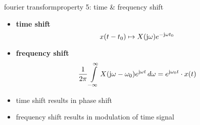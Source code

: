         \begin{frame}{fourier transform}{property 5: time \& frequency shift}
            \begin{itemize}
                \item \textbf{time shift}
                \begin{equation*}\label{eq:fft_timeshift}
                    x(t-t_0) \mapsto X(\mathrm{j}\omega){e}^{-\mathrm{j}\omega t_0} 
                \end{equation*} 
                \item \textbf{frequency shift}
                \begin{equation*}
                            \frac{1}{2\pi}\int\limits_{-\infty}^{\infty} X(\mathrm{j}\omega-\omega_0) {e}^{\mathrm{j}\omega t}\, d\omega = {e}^{\mathrm{j}\omega_0 t}\cdot x(t) 		
                \end{equation*} 
            
            \end{itemize}
            
            \bigskip
            \begin{itemize}
                \item<2->   time shift results in phase shift
                \item<2->   frequency shift results in modulation of time signal
            \end{itemize}

        \end{frame}	

